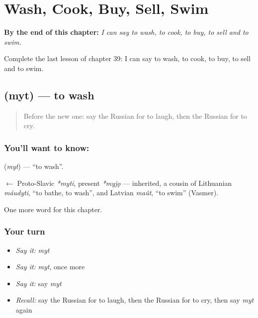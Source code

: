 
\chapter{Wash, Cook, Buy, Sell, Swim}
\label{ch:ru-wash-cook-buy-sell-swim}

\begin{chapteropening}
\textbf{By the end of this chapter:} \emph{I can say to wash, to cook, to buy, to sell and to swim.}

Complete the last lesson of chapter 39: I can say to wash, to cook, to buy, to sell and to swim.
\end{chapteropening}

\section[\texorpdfstring{\ru{мыть} (myt)}{мыть (myt)}]{ (myt) — to wash}

\label{lesson:RU-C39-myt}



\begin{quote}
Before the new one: say the Russian for to laugh, then the Russian for to cry.
\end{quote}

\subsection*{You'll want to know: }
\textbf{} (\emph{myt}) — \textquotedblleft{}to wash\textquotedblright{}.

\begin{cousinweb}
\textbf{} $\leftarrow$ Proto-Slavic \emph{*myti}, present \emph{*myjǫ} — inherited, a cousin of Lithuanian \emph{máudyti}, \textquotedblleft{}to bathe, to wash\textquotedblright{}, and Latvian \emph{maût}, \textquotedblleft{}to swim\textquotedblright{} (Vasmer).
\end{cousinweb}

\begin{grammarlens}[title={What you've built}]
One more word for this chapter.
\end{grammarlens}

\subsection*{Your turn}
\begin{itemize}
\raggedright
  \item \emph{Say it:} \emph{myt}
  \item \emph{Say it:} \emph{myt}, once more
  \item \emph{Say it:} say \emph{myt}
  \item \emph{Recall:} say the Russian for to laugh, then the Russian for to cry, then say \emph{myt} again
\end{itemize}

